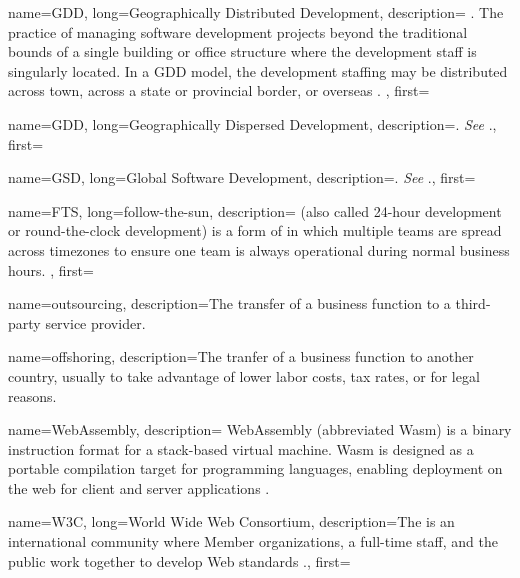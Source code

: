 {
    name=GDD, 
    long={Geographically Distributed Development},
    description={
        . The practice of managing software development projects
        beyond the traditional bounds of a single building or office structure where
        the development staff is singularly located. In a GDD model, the development
        staffing may be distributed across town, across a state or provincial
        border, or overseas \autocite{Yuhong_2008}.
    }, 
    first=
}

{
    name=GDD,
    long={Geographically Dispersed Development},
    description={. \textit{See} .},
    first=
}

{
    name=GSD,
    long={Global Software Development},
    description={. \textit{See} .},
    first=
}

{
    name=FTS,
    long={follow-the-sun},
    description={ (also called 24-hour development or
    round-the-clock development) is a form of  in which
    multiple teams are spread across timezones to ensure one team is always
    operational during normal business hours. },
    first=
}

{
    name=outsourcing, 
    description={The transfer of a business function to a third-party service provider.}
}

{
    name=offshoring, 
    description={The tranfer of a business function to another country, usually
    to take advantage of lower labor costs, tax rates, or for legal reasons.}
}

{
    name=WebAssembly, 
    description={
        WebAssembly (abbreviated Wasm) is a binary instruction format for a
        stack-based virtual machine. Wasm is designed as a portable compilation
        target for programming languages, enabling deployment on the web for client
        and server applications \autocite{Webassembly_2021}.
    }
}

{
    name=W3C, 
    long={World Wide Web Consortium}, 
    description={The 
    is an international community where Member organizations, a full-time staff,
    and the public work together to develop Web standards \autocite{W3C_2021}.},
    first=
}


